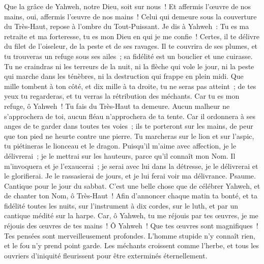 \begin{multicols}{2}
Que la grâce de Yahweh, notre Dieu, soit sur nous~! Et affermis l'œuvre de nos mains, oui, affermis l'œuvre de nos mains~!
\VerseOne{}Celui qui demeure sous la couverture du Très-Haut, repose à l'ombre du Tout-Puissant.
Je dis à Yahweh~: Tu es ma retraite et ma forteresse, tu es mon Dieu en qui je me confie~!
Certes, il te délivre du filet de l'oiseleur, de la peste et de ses ravages.
Il te couvrira de ses plumes, et tu trouveras un refuge sous ses ailes~; sa fidélité est un bouclier et une cuirasse.
Tu ne craindras ni les terreurs de la nuit, ni la flèche qui vole le jour,
ni la peste qui marche dans les ténèbres, ni la destruction qui frappe en plein midi.
Que mille tombent à ton côté, et dix mille à ta droite, tu ne seras pas atteint~;
de tes yeux tu regarderas, et tu verras la rétribution des méchants.
Car tu es mon refuge, ô Yahweh~! Tu fais du Très-Haut ta demeure.
Aucun malheur ne s'approchera de toi, aucun fléau n'approchera de ta tente.
Car il ordonnera à ses anges de te garder dans toutes tes voies~;
ils te porteront sur les mains, de peur que ton pied ne heurte contre une pierre.
Tu marcheras sur le lion et sur l'aspic, tu piétineras le lionceau et le dragon.
Puisqu'il m'aime avec affection, je le délivrerai~; je le mettrai sur les hauteurs, parce qu'il connaît mon Nom.
Il m'invoquera et je l'exaucerai~; je serai avec lui dans la détresse, je le délivrerai et le glorifierai.
Je le rassasierai de jours, et je lui ferai voir ma délivrance.
\VerseOne{}Psaume. Cantique pour le jour du sabbat.
C'est une belle chose que de célébrer Yahweh, et de chanter ton Nom, ô Très-Haut~!
Afin d'annoncer chaque matin ta bonté, et ta fidélité toutes les nuits,
sur l'instrument à dix cordes, sur le luth, et par un cantique médité sur la harpe.
Car, ô Yahweh, tu me réjouis par tes œuvres, je me réjouis des œuvres de tes mains~!
Ô Yahweh~! Que tes œuvres sont magnifiques~! Tes pensées sont merveilleusement profondes.
L'homme stupide n'y connaît rien, et le fou n'y prend point garde.
Les méchants croissent comme l'herbe, et tous les ouvriers d'iniquité fleurissent pour être exterminés éternellement.

\end{multicols}
